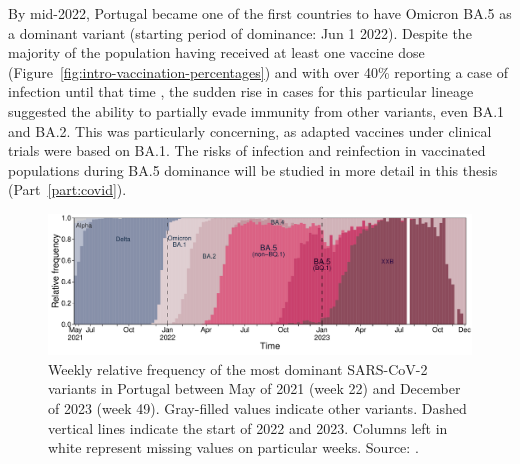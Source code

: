 By mid-2022, Portugal became one of the first countries to have Omicron BA.5 as a dominant variant (starting period of dominance: Jun 1 2022).
Despite the majority of the population having received at least one vaccine dose (Figure~\ref{fig:intro-vaccination-percentages}) and with over 40\% reporting a case of infection until that time \citep{malatoRiskBAInfection2022}, the sudden rise in cases for this particular lineage suggested the ability to partially evade immunity from other variants, even BA.1 and BA.2.
This was particularly concerning, as adapted vaccines under clinical trials were based on BA.1.
The risks of infection and reinfection in vaccinated populations during BA.5 dominance will be studied in more detail in this thesis (Part~\ref{part:covid}).

\begin{figure}[h]
    \centering
    \includegraphics[width=\textwidth]{chapter/introduction/figures/fig1-sarscov2-genetic-diversity-pt03.pdf}
    \caption[Weekly relative frequency of most dominant SARS-CoV-2 variants in Portugal between May 2021 and December 2023]{Weekly relative frequency of the most dominant SARS-CoV-2 variants in Portugal between May of 2021 (week 22) and December of 2023 (week 49). Gray-filled values indicate other variants. Dashed vertical lines indicate the start of 2022 and 2023. Columns left in white represent missing values on particular weeks. Source: \citet{institutonacionaldesaudedoutorricardojorge2023GeneticDiversity}.}
    \label{fig:intro-sarscov2-genetic-diversity-pt}
\end{figure}


